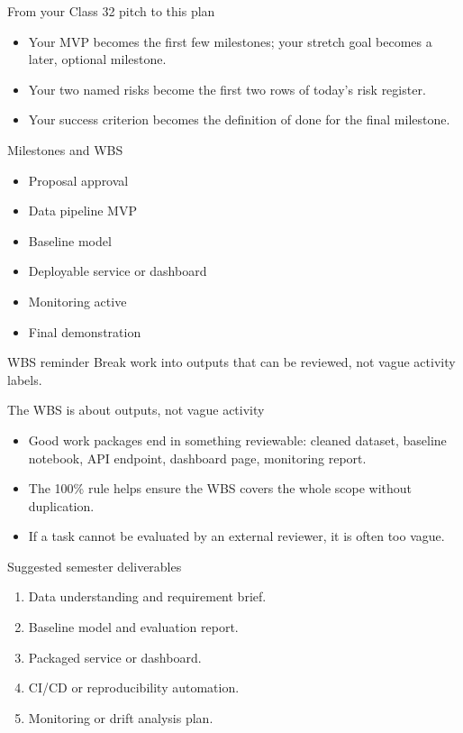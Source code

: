 \begin{frame}{From your Class 32 pitch to this plan}
\begin{itemize}
\item Your MVP becomes the first few milestones; your stretch goal becomes a later, optional milestone.
\item Your two named risks become the first two rows of today's risk register.
\item Your success criterion becomes the definition of done for the final milestone.
\end{itemize}
\coursefooter
\end{frame}

\begin{frame}{Milestones and WBS}
\begin{itemize}
\item Proposal approval
\item Data pipeline MVP
\item Baseline model
\item Deployable service or dashboard
\item Monitoring active
\item Final demonstration
\end{itemize}
\begin{block}{WBS reminder}
Break work into outputs that can be reviewed, not vague activity labels.
\end{block}
\coursefooter
\end{frame}

\begin{frame}{The WBS is about outputs, not vague activity}
\begin{itemize}
\item Good work packages end in something reviewable: cleaned dataset, baseline notebook, API endpoint, dashboard page, monitoring report.
\item The 100\% rule helps ensure the WBS covers the whole scope without duplication.
\item If a task cannot be evaluated by an external reviewer, it is often too vague.
\end{itemize}
\coursefooter
\end{frame}

\begin{frame}{Suggested semester deliverables}
\begin{enumerate}
\item Data understanding and requirement brief.
\item Baseline model and evaluation report.
\item Packaged service or dashboard.
\item CI/CD or reproducibility automation.
\item Monitoring or drift analysis plan.
\end{enumerate}
\coursefooter
\end{frame}

